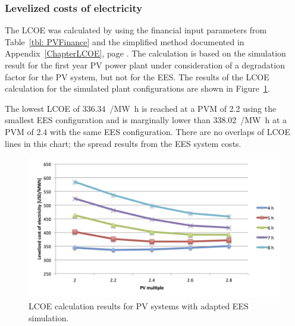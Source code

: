 \subsubsection{Levelized costs of electricity}


The LCOE was calculated by using the financial input parameters from Table~\ref{tbl: PVFinance} and the simplified method documented in Appendix~\ref{ChapterLCOE}, page \pageref{ChapterLCOE}. The calculation is based on the simulation result for the first year PV power plant under consideration of a degradation factor for the PV system, but not for the EES. The results of the LCOE calculation for the simulated plant configurations are shown in Figure~\ref{PV_LCOE}. 


The lowest LCOE of \SI{336.34}{\usd/\mega\watt\hour} is reached at a PVM of \num{2.2} using the smallest EES configuration and is marginally lower than \SI{338.02}{\usd/\mega\watt\hour} at a PVM of \num{2.4} with the same EES configuration. There are no overlaps of LCOE lines in this chart; the spread results from the EES system costs.

\begin{figure}[htbp]  
\centering
\includegraphics[width=1\linewidth]{FIG/PV_LCOE}
\caption[LCOE calculation results for PV systems with adapted EES simulation.]{LCOE calculation results for PV systems with adapted EES simulation.}\label{PV_LCOE}
\end{figure}

